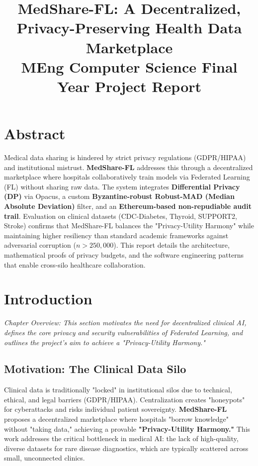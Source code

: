 \documentclass[10pt, a4paper, twocolumn]{article}
\title{\textbf{MedShare-FL: A Decentralized, Privacy-Preserving Health Data Marketplace} \\ \Large MEng Computer Science Final Year Project Report}
\begin{document}
\maketitle

\section*{Abstract}
Medical data sharing is hindered by strict privacy regulations (GDPR/HIPAA) and institutional mistrust. \textbf{MedShare-FL} addresses this through a decentralized marketplace where hospitals collaboratively train models via Federated Learning (FL) without sharing raw data. The system integrates \textbf{Differential Privacy (DP)} via Opacus, a custom \textbf{Byzantine-robust Robust-MAD (Median Absolute Deviation)} filter, and an \textbf{Ethereum-based non-repudiable audit trail}. Evaluation on clinical datasets (CDC-Diabetes, Thyroid, SUPPORT2, Stroke) confirms that MedShare-FL balances the "Privacy-Utility Harmony" while maintaining higher resiliency than standard academic frameworks against adversarial corruption ($n > 250,000$). This report details the architecture, mathematical proofs of privacy budgets, and the software engineering patterns that enable cross-silo healthcare collaboration.

\section{Introduction}

\textit{Chapter Overview: This section motivates the need for decentralized clinical AI, defines the core privacy and security vulnerabilities of Federated Learning, and outlines the project's aim to achieve a "Privacy-Utility Harmony."}

\subsection{Motivation: The Clinical Data Silo}
Clinical data is traditionally "locked" in institutional silos due to technical, ethical, and legal barriers (GDPR/HIPAA). Centralization creates "honeypots" for cyberattacks and risks individual patient sovereignty. \textbf{MedShare-FL} proposes a decentralized marketplace where hospitals "borrow knowledge" without "taking data," achieving a provable \textbf{"Privacy-Utility Harmony."} This work addresses the critical bottleneck in medical AI: the lack of high-quality, diverse datasets for rare disease diagnostics, which are typically scattered across small, unconnected clinics.
\end{document}
